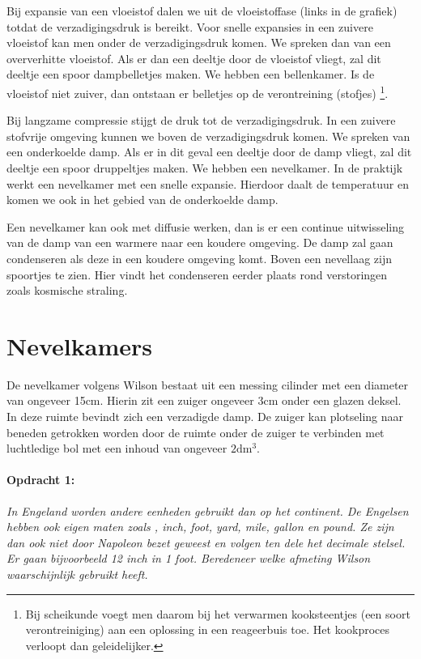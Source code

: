 Bij expansie van een vloeistof dalen we uit de vloeistoffase (links in
de grafiek) totdat de verzadigingsdruk is bereikt. Voor snelle expansies
in een zuivere vloeistof kan men onder de verzadigingsdruk komen. We
spreken dan van een oververhitte vloeistof. Als er dan een deeltje door
de vloeistof vliegt, zal dit deeltje een spoor dampbelletjes maken. We
hebben een bellenkamer. Is de vloeistof niet zuiver, dan ontstaan er
belletjes op de verontreining (stofjes) \footnote{Bij scheikunde voegt
men daarom bij het verwarmen kooksteentjes (een soort verontreiniging)
aan een oplossing in een reageerbuis toe. Het kookproces verloopt dan
geleidelijker.}. 

Bij langzame compressie stijgt de druk tot de verzadigingsdruk. In
een zuivere stofvrije omgeving kunnen we boven de verzadigingsdruk
komen. We spreken van een onderkoelde damp. Als er in dit geval een
deeltje door de damp vliegt, zal dit deeltje een spoor druppeltjes
maken. We hebben een nevelkamer. In de praktijk werkt een nevelkamer
met een snelle expansie. Hierdoor daalt de temperatuur en komen we
ook in het gebied van de onderkoelde damp.

Een nevelkamer kan ook met diffusie werken, dan is er een continue
uitwisseling van de damp van een warmere naar een koudere omgeving.
De damp zal gaan condenseren als deze in een koudere omgeving komt.
Boven een nevellaag zijn spoortjes te zien. Hier vindt het condenseren
eerder plaats rond verstoringen zoals kosmische straling.


\section{Nevelkamers}

De nevelkamer volgens Wilson bestaat uit een messing cilinder met
een diameter van ongeveer 15cm. Hierin zit een zuiger ongeveer 3cm
onder een glazen deksel. In deze ruimte bevindt zich een verzadigde
damp. De zuiger kan plotseling naar beneden getrokken worden door
de ruimte onder de zuiger te verbinden met luchtledige bol met een
inhoud van ongeveer $2\mathrm{dm^{3}}$. 


\paragraph*{Opdracht 1:}

\emph{In Engeland worden andere eenheden gebruikt dan op het continent.
De Engelsen hebben ook eigen maten zoals , inch, foot, yard, mile,
gallon en pound. Ze zijn dan ook niet door Napoleon bezet geweest
en volgen ten dele het decimale stelsel. Er gaan bijvoorbeeld 12 inch
in 1 foot. Beredeneer welke afmeting Wilson waarschijnlijk gebruikt
heeft.}

